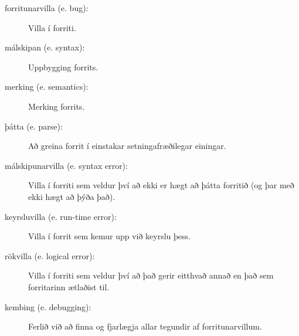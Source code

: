 \begin{description}
\item[forritunarvilla (e. bug):]  Villa í forriti.

\item[málskipan (e. syntax):]  Uppbygging forrits.

\item[merking (e. semantics):]  Merking forrits.

\item[þátta (e. parse):]  Að greina forrit í einstakar setningafræðilegar einingar.

\item[málskipunarvilla (e. syntax error):]  Villa í forriti sem veldur því að ekki er hægt að þátta forritið (og þar með ekki hægt að þýða það).

\item[keyrsluvilla (e. run-time error):]  Villa í forrit sem kemur upp við keyrslu þess. 

\item[rökvilla (e. logical error):]  Villa í forriti sem veldur því að það gerir eitthvað annað en það sem forritarinn ætlaðist til.

\item[kembing (e. debugging):]  Ferlið við að finna og fjarlægja allar tegundir af forritunarvillum.


\end{description}